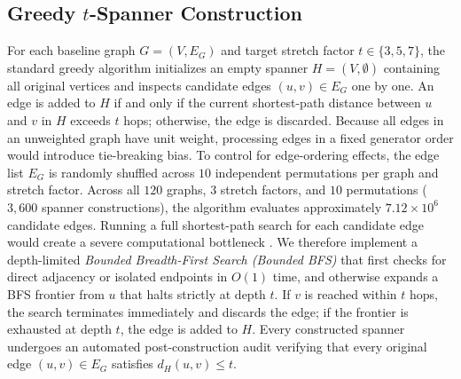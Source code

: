 \documentclass[conference]{IEEEtran}
\begin{document}
\subsection{Greedy $t$-Spanner Construction}
For each baseline graph $G = (V, E_G)$ and target stretch factor $t \in \{3, 5, 7\}$, the standard greedy algorithm \cite{ref2} initializes an empty spanner $H = (V, \emptyset)$ containing all original vertices and inspects candidate edges $(u, v) \in E_G$ one by one. An edge is added to $H$ if and only if the current shortest-path distance between $u$ and $v$ in $H$ exceeds $t$ hops; otherwise, the edge is discarded.
Because all edges in an unweighted graph have unit weight, processing edges in a fixed generator order would introduce tie-breaking bias. To control for edge-ordering effects, the edge list $E_G$ is randomly shuffled across $10$ independent permutations per graph and stretch factor.
Across all $120$ graphs, $3$ stretch factors, and $10$ permutations ($3,600$ spanner constructions), the algorithm evaluates approximately $7.12 \times 10^6$ candidate edges. Running a full shortest-path search for each candidate edge would create a severe computational bottleneck \cite{ref23, ref22}. We therefore implement a depth-limited \textit{Bounded Breadth-First Search (Bounded BFS)} that first checks for direct adjacency or isolated endpoints in $O(1)$ time, and otherwise expands a BFS frontier from $u$ that halts strictly at depth $t$. If $v$ is reached within $t$ hops, the search terminates immediately and discards the edge; if the frontier is exhausted at depth $t$, the edge is added to $H$. Every constructed spanner undergoes an automated post-construction audit verifying that every original edge $(u, v) \in E_G$ satisfies $d_H(u, v) \le t$.
\end{document}
